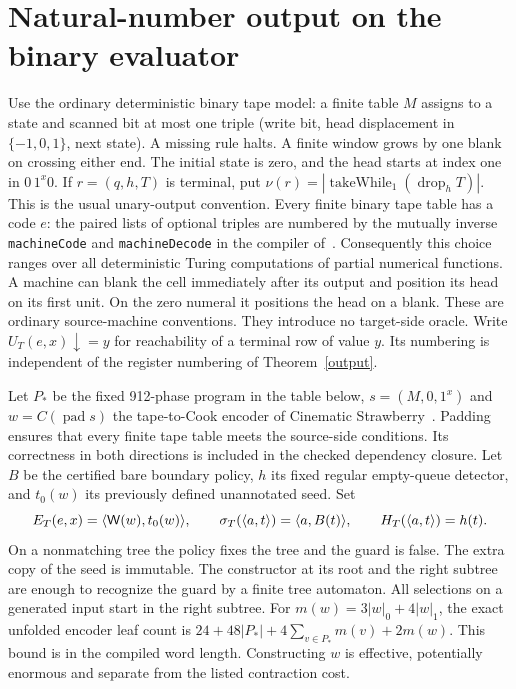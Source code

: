 \section{Natural-number output on the binary evaluator}\label{numericv2}
Use the ordinary deterministic binary tape model: a finite table \(M\) assigns to a state and scanned bit at most one triple (write bit, head displacement in \(\{-1,0,1\}\), next state). A missing rule halts. A finite window grows by one blank on crossing either end. The initial state is zero, and the head starts at index one in \(0\,1^x0\). If \(r=(q,h,T)\) is terminal, put \(\nu(r)=|\operatorname{takeWhile}_{1}(\operatorname{drop}_{h}T)|\). This is the usual unary-output convention. Every finite binary tape table has a code \(e\): the paired lists of optional triples are numbered by the mutually inverse \texttt{machineCode} and \texttt{machineDecode} in the compiler of~\cite{filin}. Consequently this choice ranges over all deterministic Turing computations of partial numerical functions. A machine can blank the cell immediately after its output and position its head on its first unit. On the zero numeral it positions the head on a blank. These are ordinary source-machine conventions. They introduce no target-side oracle. Write \(U_T(e,x)\downarrow=y\) for reachability of a terminal row of value \(y\). Its numbering is independent of the register numbering of Theorem~\ref{output}.

Let \(P_*\) be the fixed 912-phase program in the table below, \(s=(M,0,1^x)\) and \(w=C(\operatorname{pad}s)\) the tape-to-Cook encoder of Cinematic Strawberry~\cite{filin}. Padding ensures that every finite tape table meets the source-side conditions. Its correctness in both directions is included in the checked dependency closure. Let \(B\) be the certified bare boundary policy, \(h\) its fixed regular empty-queue detector, and \(t_0(w)\) its previously defined unannotated seed. Set
\[
 E_T(e,x)=\langle \mathsf W(w),t_0(w)\rangle,\qquad
 \sigma_T(\langle a,t\rangle)=\langle a,B(t)\rangle,\qquad H_T(\langle a,t\rangle)=h(t).
\]
On a nonmatching tree the policy fixes the tree and the guard is false. The extra copy of the seed is immutable. The constructor at its root and the right subtree are enough to recognize the guard by a finite tree automaton. All selections on a generated input start in the right subtree. For \(m(w)=3|w|_0+4|w|_1\), the exact unfolded encoder leaf count is
\(24+48|P_*|+4\sum_{v\in P_*}m(v)+2m(w)\).
This bound is in the compiled word length. Constructing \(w\) is effective, potentially enormous and separate from the listed contraction cost.

